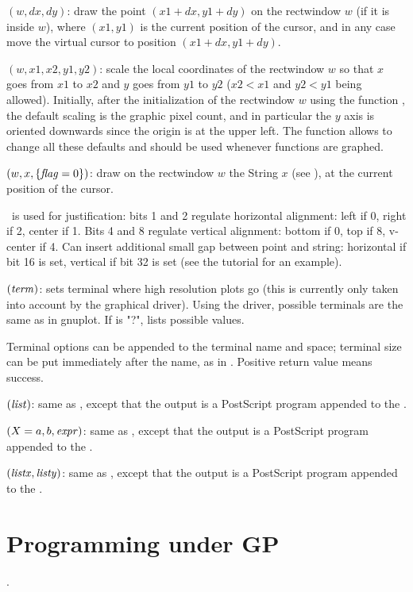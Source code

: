 $(w,dx,dy)$: draw the point $(x1+dx,y1+dy)$ on the
rectwindow $w$ (if it is inside $w$), where $(x1,y1)$ is the current position
of the cursor, and in any case move the virtual cursor to position
$(x1+dx,y1+dy)$.

$(w,x1,x2,y1,y2)$: scale the local coordinates of the
rectwindow $w$ so that $x$ goes from $x1$ to $x2$ and $y$ goes from $y1$ to
$y2$ ($x2<x1$ and $y2<y1$ being allowed). Initially, after the initialization
of the rectwindow $w$ using the function , the default scaling
is the graphic pixel count, and in particular the $y$ axis is oriented
downwards since the origin is at the upper left. The function 
allows to change all these defaults and should be used whenever functions are
graphed.

$(w,x,\{\hbox{\it f\kern0pt lag\/}=0\})$: draw on the rectwindow $w$ the
String $x$ (see ), at the current position of the cursor.

\fl\ is used for justification: bits 1 and 2 regulate horizontal alignment:
left if 0, right if 2, center if 1. Bits 4 and 8 regulate vertical
alignment: bottom if 0, top if 8, v-center if 4. Can insert additional
small gap between point and string: horizontal if bit 16 is set, vertical
if bit 32 is set (see the tutorial for an example).

$(\hbox{\it term\/})$: sets terminal where high resolution
plots go (this is currently only taken into account by the 
graphical driver). Using the  driver, possible terminals are
the same as in gnuplot. If  is "?", lists possible values.

Terminal options can be appended to the terminal name and space; terminal
size can be put immediately after the name, as in .
Positive return value means success.

$(\hbox{\it list\/})$: same as , except that the
output is a PostScript program appended to the .

$(X=a,b,\hbox{\it expr\/})$: same as , except that the
output is a PostScript program appended to the .

$(\hbox{\it listx\/},\hbox{\it listy\/})$: same as ,
except that the output is a PostScript program appended to the .

\section{Programming under GP}
\label{se:programming}
.


